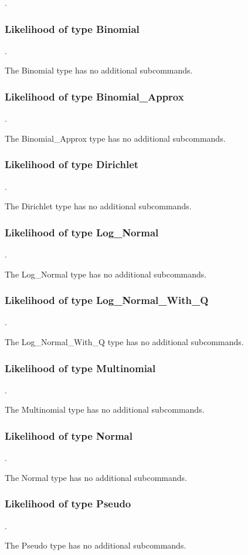 .
\label{syntax:Likelihood}

\subsubsection{Likelihood of type Binomial}
.
\label{syntax:Likelihood-Binomial}

The Binomial type has no additional subcommands.
\subsubsection{Likelihood of type Binomial\_Approx}
.
\label{syntax:Likelihood-BinomialApprox}

The Binomial\_Approx type has no additional subcommands.
\subsubsection{Likelihood of type Dirichlet}
.
\label{syntax:Likelihood-Dirichlet}

The Dirichlet type has no additional subcommands.
\subsubsection{Likelihood of type Log\_Normal}
.
\label{syntax:Likelihood-LogNormal}

The Log\_Normal type has no additional subcommands.
\subsubsection{Likelihood of type Log\_Normal\_With\_Q}
.
\label{syntax:Likelihood-LogNormalWithQ}

The Log\_Normal\_With\_Q type has no additional subcommands.
\subsubsection{Likelihood of type Multinomial}
.
\label{syntax:Likelihood-Multinomial}

The Multinomial type has no additional subcommands.
\subsubsection{Likelihood of type Normal}
.
\label{syntax:Likelihood-Normal}

The Normal type has no additional subcommands.
\subsubsection{Likelihood of type Pseudo}
.
\label{syntax:Likelihood-Pseudo}

The Pseudo type has no additional subcommands.
